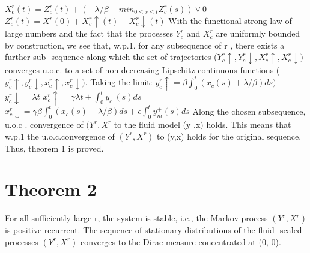 \newline $X^r_c(t)=Z^r_c(t) + (- \lambda/ \beta - min_{0\leq s \leq t} Z^r_c (s)) \vee 0$
\newline $Z^r_c(t)= X^r(0) + X_c^r \uparrow(t) - X_c^r \downarrow(t)$
\newline\newline
With the functional strong law of large numbers and the fact that the processes $Y^r_c$ and $X^r_c $ are uniformly bounded by
construction, we see that, w.p.1. for any subsequence of r , there exists a further sub- sequence along which the set of trajectories ($Y^r_c\uparrow,Y^r_c\downarrow,X^r_c\uparrow,X^r_c\downarrow)$ converges u.o.c. to a set of non-decreasing Lipschitz continuous functions ($y^r_c\uparrow,y^r_c\downarrow,x^r_c\uparrow,x^r_c\downarrow)$. Taking the limit:
\newline
$y^r_c\uparrow= \beta \int_0^t(x_c(s) + \lambda/\beta) ds)$
\newline $y^r_c\downarrow=\lambda t$
\newline $x^r_c\uparrow= \gamma \lambda t + \int_0^t y_c^-(s)ds$
\newline $x^r_c\downarrow= \gamma \beta \int_0^t (x_c(s) +\lambda/\beta) ds + \epsilon \int_0^t y_m^+(s) ds$
\newline\newline
 Along the chosen subsequence, u.o.c . convergence of $(Y^r,X^r$ to the fluid model (y ,x) holds. This means that w.p.1 the u.o.c.convergence of $(Y^r,X^r)$ to (y,x) holds for the original sequence. Thus, theorem 1 is proved. 


 \section*{Theorem 2}
 For all sufficiently large r, the system is stable, i.e., the Markov process $(Y^r, X^r)$ is positive recurrent. The sequence of stationary distributions of the fluid- scaled processes $(Y^r , X^ r) $ converges to the Dirac measure concentrated at (0, 0).
 
